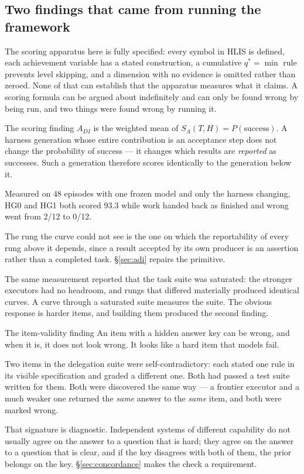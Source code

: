 \documentclass[11pt]{article}
\theoremstyle{definition}
\newcommand{\SA}{\ensuremath{S_A(T,H)}}
\begin{document}
\subsection{Two findings that came from running the framework}

The scoring apparatus here is fully specified: every symbol in HLIS is defined, each achievement variable has a stated construction, a cumulative $q^{*}=\min$ rule prevents level skipping, and a dimension with no evidence is omitted rather than zeroed. None of that can establish that the apparatus measures what it claims. A scoring formula can be argued about indefinitely and can only be found wrong by being run, and two things were found wrong by running it.

\begin{cautionbox}{The scoring finding}
$A_{DI}$ is the weighted mean of $\SA{} = P(\text{success})$. A harness generation whose entire contribution is an acceptance step does not change the probability of success --- it changes which results are \emph{reported} as successes. Such a generation therefore scores identically to the generation below it.

Measured on 48 episodes with one frozen model and only the harness changing, HG0 and HG1 both scored 93.3 while work handed back as finished and wrong went from 2/12 to 0/12.

The rung the curve could not see is the one on which the reportability of every rung above it depends, since a result accepted by its own producer is an assertion rather than a completed task. \S\ref{sec:adi} repairs the primitive.
\end{cautionbox}

The same measurement reported that the task suite was saturated: the stronger executors had no headroom, and rungs that differed materially produced identical curves. A curve through a saturated suite measures the suite. The obvious response is harder items, and building them produced the second finding.

\begin{cautionbox}{The item-validity finding}
An item with a hidden answer key can be wrong, and when it is, it does not look wrong. It looks like a hard item that models fail.

Two items in the delegation suite were self-contradictory: each stated one rule in its visible specification and graded a different one. Both had passed a test suite written for them. Both were discovered the same way --- a frontier executor and a much weaker one returned the \emph{same} answer to the \emph{same} item, and both were marked wrong.

That signature is diagnostic. Independent systems of different capability do not usually agree on the answer to a question that is hard; they agree on the answer to a question that is clear, and if the key disagrees with both of them, the prior belongs on the key. \S\ref{sec:concordance} makes the check a requirement.
\end{cautionbox}
\end{document}
